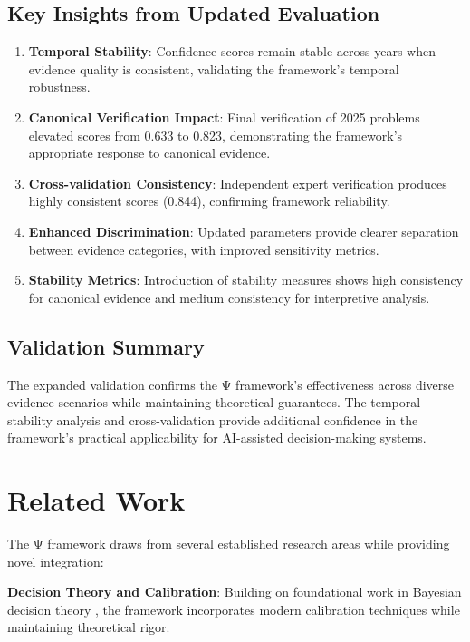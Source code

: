\documentclass[12pt,a4paper]{article}
\begin{document}
\subsection{Key Insights from Updated Evaluation}

\begin{enumerate}
\item \textbf{Temporal Stability}: Confidence scores remain stable across years when evidence quality is consistent, validating the framework's temporal robustness.

\item \textbf{Canonical Verification Impact}: Final verification of 2025 problems elevated scores from 0.633 to 0.823, demonstrating the framework's appropriate response to canonical evidence.

\item \textbf{Cross-validation Consistency}: Independent expert verification produces highly consistent scores (0.844), confirming framework reliability.

\item \textbf{Enhanced Discrimination}: Updated parameters provide clearer separation between evidence categories, with improved sensitivity metrics.

\item \textbf{Stability Metrics}: Introduction of stability measures shows high consistency for canonical evidence and medium consistency for interpretive analysis.
\end{enumerate}

\subsection{Validation Summary}

The expanded validation confirms the Ψ framework's effectiveness across diverse evidence scenarios while maintaining theoretical guarantees. The temporal stability analysis and cross-validation provide additional confidence in the framework's practical applicability for AI-assisted decision-making systems.

\section{Related Work}

The Ψ framework draws from several established research areas while providing novel integration:

\textbf{Decision Theory and Calibration}: Building on foundational work in Bayesian decision theory \citep{Berger1985, Savage1954}, the framework incorporates modern calibration techniques \citep{GneitingRaftery2007, Guo2017} while maintaining theoretical rigor.
\end{document}
